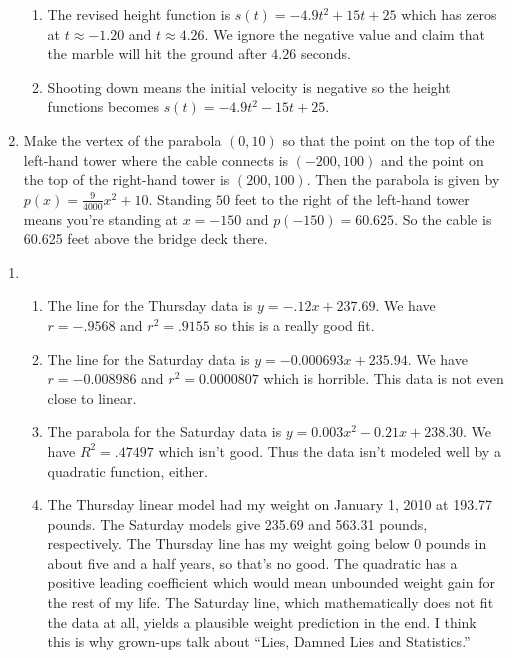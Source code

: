 \begin{exenum}
\begin{enumerate}
\begin{enumerate}
\item The revised height function is $s(t) = -4.9t^{2} + 15t + 25$ which has zeros at $t \approx -1.20$ and $t \approx 4.26$.  We ignore the negative value and claim that the marble will hit the ground after $4.26$ seconds.

\item Shooting down means the initial velocity is negative so the height functions becomes $s(t) = -4.9t^{2} - 15t + 25$.

\end{enumerate}

\item Make the vertex of the parabola $(0, 10)$ so that the point on the top of the left-hand tower where the cable connects is $(-200, 100)$ and the point on the top of the right-hand tower is $(200, 100)$.  Then the parabola is given by $p(x) = \frac{9}{4000}x^{2} + 10$.  Standing $50$ feet to the right of the left-hand tower means you're standing at $x= -150$ and $p(-150) = 60.625$.  So the cable is 60.625 feet above the bridge deck there.


\setcounter{HW}{\value{enumi}}
\end{enumerate}

\begin{enumerate}
\setcounter{enumi}{\value{HW}}

\item \begin{enumerate}

\item The line for the Thursday data is $y = -.12x + 237.69$.  We have $r = -.9568$ and $r^{2} = .9155$ so this is a really good fit.

\item The line for the Saturday data is $y = -0.000693x + 235.94$.  We have $r = -0.008986$ and $r^{2} = 0.0000807$ which is horrible.  This data is not even close to linear.  

\item The parabola for the Saturday data is $y = 0.003x^{2} - 0.21x + 238.30$.  We have $R^{2} = .47497$ which isn't good.  Thus the data isn't modeled well by a quadratic function, either.

\item The Thursday linear model had my weight on January 1, 2010 at 193.77 pounds.  The Saturday models give 235.69 and 563.31 pounds, respectively.  The Thursday line has my weight going below 0 pounds in about five and a half years, so that's no good.  The quadratic has a positive leading coefficient which would mean unbounded weight gain for the rest of my life.  The Saturday line, which mathematically does not fit the data at all, yields a plausible weight prediction in the end.  I think this is why grown-ups talk about ``Lies, Damned Lies and Statistics.''


\end{enumerate}
\end{enumerate}
\end{exenum}
